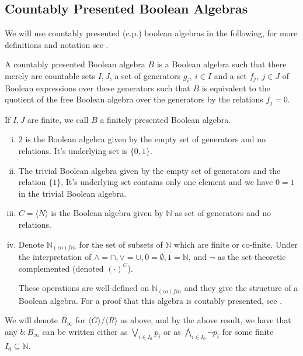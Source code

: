 \subsection{Countably Presented Boolean Algebras}
We will use countably presented (c.p.) boolean algebras in the following, for more definitions and notation see .

\begin{definition}
  A countably presented Boolean algebra $B$ is a Boolean algebra such that there merely are 
  countable sets $I,J$, 
  a set of generators $g_i,~{i\in I}$ and a set $f_j,~{j\in J}$ of Boolean expressions over these generators 
  such that $B$ is equivalent to the quotient of the free Boolean algebra over the generators by the relations
  $f_j=0$. 
\end{definition} 
If $I,J$ are finite, we call $B$ a finitely presented Boolean algebra. 

\begin{example}
  \begin{enumerate}[(i)]
  \item $2$ is the Boolean algebra given by the empty set of generators and no relations. 
    It's underlying set is $\{0,1\}$. 
  \item   The trivial Boolean algebra given by the empty set of generators and the relation $\{1\}$, 
    It's underlying set contains only one element and we have $0=1$ in the trivial Boolean algebra. 
  \item\label{ExampleBAunderCantor}   $C = \langle N \rangle $ is the Boolean algebra given by $\mathbb N$ as set of generators and no relations. 
  \item\label{ExampleBAunderNinfty}
    Denote $\mathbb N_{(co)fin}$ for the set of subsets of $\mathbb N$ which are finite or co-finite. 
    Under the interpretation of $\wedge = \cap , \vee = \cup, 0 = \emptyset, 1 = \mathbb N$, and $\neg$ 
    as the set-theoretic complemented (denoted $(\cdot)^C$). 
    
    These operations are well-defined on $\mathbb N_{(co)fin}$ 
    and they give the structure of a Boolean algebra. For a proof that this algebra is coutably presented, see .
  \end{enumerate}
\end{example}

\begin{remark}
  We will denote $B_\infty$ for $\langle G \rangle/ \langle R\rangle $ as above, 
  and by the above result, we have that any $b:B_\infty$ can be written 
  either as $\bigvee_{i\in I_0} p_i$ or as $\bigwedge_{i\in I_0} \neg p_i$ for some finite $I_0\subseteq \mathbb N$. 
\end{remark}


